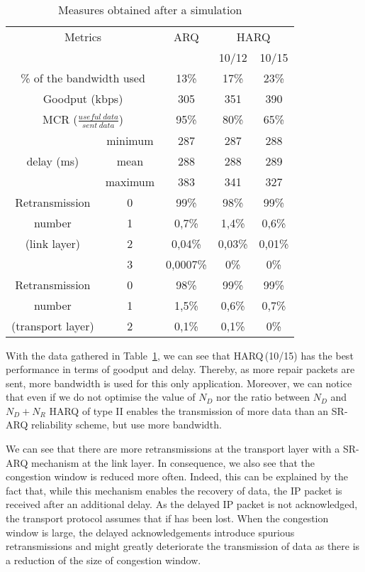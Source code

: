 \documentclass[conference,letterpaper]{IEEEtran}
\begin{document}
\begin{table}[h]
\caption{Measures obtained after a simulation}
\label{tab::out_of_simu}
\begin{center}
\begin{tabular}[h]{|c|c|c|c|c|}
\hline
\multicolumn{2}{|c|}{Metrics} & ARQ & \multicolumn{2}{|c|}{HARQ} \\
\cline{4-5}
\multicolumn{2}{|c|}{} & & 10/12 & 10/15 \\
\hline
\multicolumn{2}{|c|}{\% of the bandwidth used} & 13\% & 17\% & 23\% \\
\hline
\multicolumn{2}{|c|}{Goodput (kbps)} & 305 & 351 & 390 \\
\hline
\multicolumn{2}{|c|}{MCR ($\frac{useful~data}{sent~data}$)} & 95\% & 80\% & 65\% \\
\hline
 & minimum & 287 & 287 & 288 \\
\cline{2-5}
delay (ms) & mean & 288 & 288 & 289 \\
\cline{2-5}
 & maximum & 383 & 341 & 327 \\
\hline
Retransmission & 0 & 99\% &  98\% &  99\% \\
\cline{2-5}
number & 1 & 0,7\% & 1,4\% & 0,6\% \\
\cline{2-5}
(link layer) & 2 & 0,04\% & 0,03\% & 0,01\% \\
\cline{2-5}
 & 3 & 0,0007\% & 0\% & 0\%\\
\hline
Retransmission & 0 & 98\% & 99\% & 99\% \\
\cline{2-5}
number & 1 & 1,5\% & 0,6\% & 0,7\% \\
\cline{2-5}
(transport layer) & 2 & 0,1\% & 0,1\% & 0\% \\
\hline
\end{tabular}
\end{center}
\end{table}

With the data gathered in Table~\ref{tab::out_of_simu}, we can see that HARQ\,(10/15) has the best performance in terms of goodput and delay. Thereby, as more repair packets are sent, more bandwidth is used for this only application. Moreover, we can notice that even if we do not optimise the value of $N_D$ nor the ratio between $N_D$ and $N_D+N_R$ HARQ of type II enables the transmission of more data than an SR-ARQ reliability scheme, but use more bandwidth. 

We can see that there are more retransmissions at the transport layer with a SR-ARQ mechanism at the link layer. In consequence, we also see that the congestion window is reduced more often. Indeed, this can be explained by the fact that, while this mechanism enables the recovery of data, the IP packet is received after an additional delay. As the delayed IP packet is not acknowledged, the transport protocol assumes that if has been lost. When the congestion window is large, the delayed acknowledgements introduce spurious retransmissions and might greatly deteriorate the transmission of data as there is a reduction of the size of congestion window.
\end{document}
